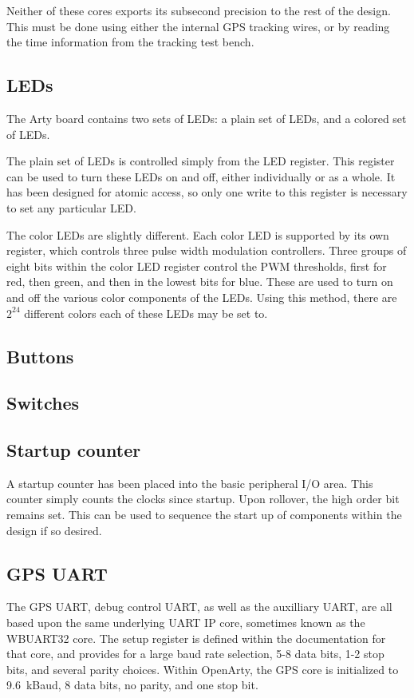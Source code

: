 \documentclass{gqtekspec}
\begin{document}
Neither of these cores exports its subsecond precision to the rest of the
design.  This must be done using either the internal GPS tracking wires, or
by reading the time information from the tracking test bench.

\subsection{LEDs}

The Arty board contains two sets of LEDs: a plain set of LEDs, and a colored
set of LEDs.

The plain set of LEDs is controlled simply from the LED register.  This register
can be used to turn these LEDs on and off, either individually or as a whole.
It has been designed for atomic access, so only one write to this register
is necessary to set any particular LED.

The color LEDs are slightly different.  Each color LED is supported by its
own register, which controls three pulse width modulation controllers.  Three
groups of eight bits within the color LED register control the PWM thresholds,
first for red, then green, and then in the lowest bits for blue.  These are
used to turn on and off the various color components of the LEDs.  Using this
method, there are $2^{24}$ different colors each of these LEDs may be set
to.  

\subsection{Buttons}
\subsection{Switches}
\subsection{Startup counter}

A startup counter has been placed into the basic peripheral I/O area.  This 
counter simply counts the clocks since startup.  Upon rollover, the high
order bit remains set.  This can be used to sequence the start up of components
within the design if so desired.

\subsection{GPS UART}
The GPS UART, debug control UART, as well as the auxilliary UART, are all
based upon the same underlying UART IP core, sometimes known as the WBUART32
core.  The setup register is defined within the documentation for that core,
and provides for a large baud rate selection, 5-8 data bits, 1-2 stop bits,
and several parity choices.  Within OpenArty, the GPS core is initialized
to 9.6~kBaud, 8 data bits, no parity, and one stop bit.  
\end{document}
